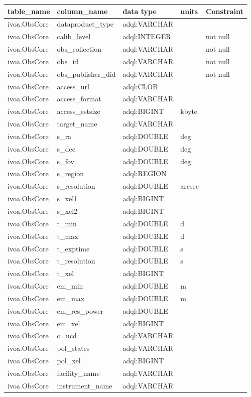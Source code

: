 \documentclass[11pt,a4paper]{ivoa}
\begin{document}
\begin{longtable}{|p{}|p{}|p{}|p{}|p{}|}
\hline
table\_name & column\_name & data type & units & Constraint\\\hline
ivoa.ObsCore & dataproduct\_type & adql:VARCHAR &  & \\\hline
ivoa.ObsCore & calib\_level & adql:INTEGER & & not null\\\hline
ivoa.ObsCore & obs\_collection & adql:VARCHAR & & not null\\\hline
ivoa.ObsCore & obs\_id & adql:VARCHAR & & not null\\\hline
ivoa.ObsCore & obs\_publisher\_did & adql:VARCHAR & & not null\\\hline
ivoa.ObsCore & access\_url & adql:CLOB & & \\\hline
ivoa.ObsCore & access\_format & adql:VARCHAR & & \\\hline
ivoa.ObsCore & access\_estsize & adql:BIGINT & kbyte & \\\hline
ivoa.ObsCore & target\_name & adql:VARCHAR & & \\\hline
ivoa.ObsCore & s\_ra & adql:DOUBLE & deg & \\\hline
ivoa.ObsCore & s\_dec & adql:DOUBLE & deg  & \\\hline
ivoa.ObsCore & s\_fov & adql:DOUBLE & deg  & \\\hline
ivoa.ObsCore & s\_region & adql:REGION &  & \\\hline
ivoa.ObsCore & s\_resolution & adql:DOUBLE & arcsec  & \\\hline
ivoa.ObsCore & s\_xel1 & adql:BIGINT &  & \\\hline
ivoa.ObsCore & s\_xel2 & adql:BIGINT &  & \\\hline
ivoa.ObsCore & t\_min & adql:DOUBLE & d  & \\\hline
ivoa.ObsCore & t\_max & adql:DOUBLE & d  & \\\hline
ivoa.ObsCore & t\_exptime & adql:DOUBLE & s  & \\\hline
ivoa.ObsCore & t\_resolution & adql:DOUBLE & s  & \\\hline
ivoa.ObsCore & t\_xel & adql:BIGINT &  & \\\hline
ivoa.ObsCore & em\_min & adql:DOUBLE & m & \\\hline
ivoa.ObsCore & em\_max & adql:DOUBLE & m & \\\hline
ivoa.ObsCore & em\_res\_power & adql:DOUBLE & & \\\hline
ivoa.ObsCore & em\_xel & adql:BIGINT & & \\\hline
ivoa.ObsCore & o\_ucd & adql:VARCHAR & & \\\hline
ivoa.ObsCore & pol\_states  & adql:VARCHAR & & \\\hline
ivoa.ObsCore & pol\_xel & adql:BIGINT & & \\\hline
ivoa.ObsCore & facility\_name & adql:VARCHAR & & \\\hline
ivoa.ObsCore & instrument\_name & adql:VARCHAR & & \\\hline
\end{longtable}
\end{document}
